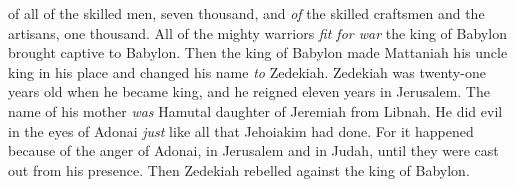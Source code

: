 \begin{biblechapter}
\verse of all of the skilled men, seven thousand, and \textit{of} the skilled craftsmen and the artisans, one thousand. All of the mighty warriors \textit{fit for war} the king of Babylon brought captive to Babylon.
\verse Then the king of Babylon made Mattaniah his uncle king in his place and changed his name \textit{to} Zedekiah.
 Zedekiah was twenty-one years old when he became king, and he reigned eleven years in Jerusalem. The name of his mother \textit{was} Hamutal daughter of Jeremiah from Libnah.
\verse He did evil in the eyes of Adonai \textit{just} like all that Jehoiakim had done.
\verse For it happened because of the anger of Adonai, in Jerusalem and in Judah, until they were cast out from his presence. Then Zedekiah rebelled against the king of Babylon.
\end{biblechapter}

